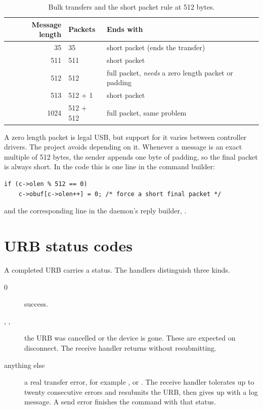 \begin{table}[ht]
\centering
\begin{tabular}{rll}
\toprule
Message length & Packets & Ends with \\
\midrule
35 & 35 & short packet (ends the transfer) \\
511 & 511 & short packet \\
512 & 512 & full packet, \emph{needs} a zero length packet or padding \\
513 & 512 + 1 & short packet \\
1024 & 512 + 512 & full packet, same problem \\
\bottomrule
\end{tabular}
\caption{Bulk transfers and the short packet rule at 512 bytes.}\label{tab:bulk}
\end{table}

A zero length packet is legal USB, but support for it varies between controller drivers. The project avoids depending on it. Whenever a message is an exact multiple of 512 bytes, the sender appends one byte of padding, so the final packet is always short. In the code this is one line in the command builder:

\begin{lstlisting}
if (c->olen % 512 == 0)
	c->obuf[c->olen++] = 0; /* force a short final packet */
\end{lstlisting}

and the corresponding line in the daemon's reply builder, .

\section{URB status codes}

A completed URB carries a status. The handlers distinguish three kinds.

\begin{description}
  \item[0] success.
  \item[, , ] the URB was cancelled or the device is gone. These are expected on disconnect. The receive handler returns without resubmitting.
  \item[anything else] a real transfer error, for example ,  or . The receive handler tolerates up to twenty consecutive errors and resubmits the URB, then gives up with a log message. A send error finishes the command with that status.
\end{description}

